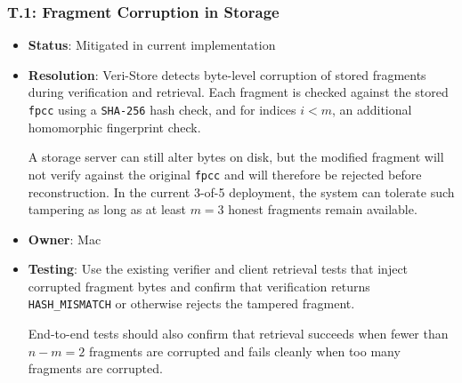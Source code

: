 \documentclass[../veristore_security_model.tex]{subfiles}
\begin{document}
\subsubsection{T.1: Fragment Corruption in Storage}
\begin{itemize}
    \item \textbf{Status}: Mitigated in current implementation
    \item \textbf{Resolution}: Veri-Store detects byte-level corruption of stored fragments during verification and retrieval. Each fragment is checked against the stored \texttt{fpcc} using a \texttt{SHA-256} hash check, and for indices $i < m$, an additional homomorphic fingerprint check.
    
    A storage server can still alter bytes on disk, but the modified fragment will not verify against the original \texttt{fpcc} and will therefore be rejected before reconstruction. In the current 3-of-5 deployment, the system can tolerate such tampering as long as at least $m = 3$ honest fragments remain available.
    \item \textbf{Owner}: Mac
    \item \textbf{Testing}: Use the existing verifier and client retrieval tests that inject corrupted fragment bytes and confirm that verification returns \texttt{HASH\_MISMATCH} or otherwise rejects the tampered fragment. 
    
    End-to-end tests should also confirm that retrieval succeeds when fewer than $n - m = 2$ fragments are corrupted and fails cleanly when too many fragments are corrupted.
\end{itemize}
\end{document}
